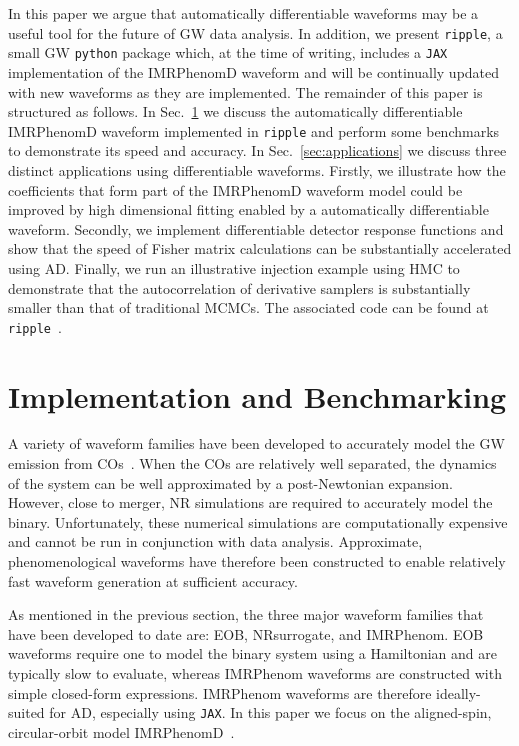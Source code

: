 \documentclass[twocolumn]{aastex631}
\newcommand{\jax}{\texttt{JAX}\xspace}
\newcommand{\ripple}{\texttt{ripple}\xspace}
\begin{document}
In this paper we argue that automatically differentiable waveforms may be a useful tool for the future of GW data analysis.
In addition, we present \ripple, a small GW \texttt{python} package which, at the time of writing, includes a \jax implementation of the IMRPhenomD waveform and will be continually updated with new waveforms as they are implemented.
The remainder of this paper is structured as follows. 
In Sec.~\ref{sec:waveforms} we discuss the automatically differentiable IMRPhenomD waveform implemented in \ripple and perform some benchmarks to demonstrate its speed and accuracy. 
In Sec.~\ref{sec:applications} we discuss three distinct applications using differentiable waveforms. 
Firstly, we illustrate how the coefficients that form part of the IMRPhenomD waveform model could be improved by high dimensional fitting enabled by a automatically differentiable waveform. 
Secondly, we implement differentiable detector response functions and show that the speed of Fisher matrix calculations can be substantially accelerated using AD.
Finally, we run an illustrative injection example using HMC to demonstrate that the autocorrelation of derivative samplers is substantially smaller than that of traditional MCMCs.
The associated code can be found at \ripple~\citep{ripple}.

\section{Implementation and Benchmarking}
\label{sec:waveforms}

A variety of waveform families have been developed to accurately model the GW emission from COs~\citep{Schmidtreview}. 
When the COs are relatively well separated, the dynamics of the system can be well approximated by a post-Newtonian expansion.
However, close to merger, NR simulations are required to accurately model the binary.
Unfortunately, these numerical simulations are computationally expensive and cannot be run in conjunction with data analysis.
Approximate, phenomenological waveforms have therefore been constructed to enable relatively fast waveform generation at sufficient accuracy.

As mentioned in the previous section, the three major waveform families that have been developed to date are:  EOB,  NRsurrogate, and IMRPhenom.
EOB waveforms require one to model the binary system using a Hamiltonian and are typically slow to evaluate, whereas IMRPhenom waveforms are constructed with simple closed-form expressions.
IMRPhenom waveforms are therefore ideally-suited for AD, especially using \jax. 
In this paper we focus on the aligned-spin, circular-orbit model IMRPhenomD~\citep{Husa:2015iqa, Khan:2015jqa}.
\end{document}

